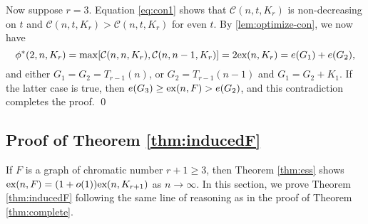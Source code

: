 \documentclass[12pt]{article}
\newcommand*{\ex}{\textnormal{ex}}
\newcommand*{\con}{\mathcal{C}}
\begin{document}
Now suppose $r = 3$. Equation \eqref{eq:con1} shows that $\con(n, t, K_r)$ is non-decreasing on $t$ and $\con(n, t, K_r) > \con(n, t, K_r)$ for even $t$. By \cref{lem:optimize-con}, we now have 
\[
  \phi^*(2, n, K_r) = \max[\con(n, n, K_r), \con(n, n - 1, K_r)] = 2\ex(n, K_r) = e(G_1) + e(G_2),
\]
and either $G_1 = G_2 = T_{r - 1}(n)$, or $G_2 = T_{r - 1}(n - 1)$ and $G_1 = G_2 + K_1$. If the latter case is true, then $e(G_3) \geq \ex(n, F) > e(G_2)$, and this contradiction completes the proof. \qed

\subsection{Proof of Theorem \ref{thm:inducedF}}

If $F$ is a graph of chromatic number $r + 1 \geq 3$, then Theorem \ref{thm:ess} shows 
$\ex(n,F)= (1 + o(1))\ex(n,K_{r+1})$ as $n \rightarrow \infty$. In this section, we prove Theorem \ref{thm:inducedF} following the same line of reasoning as in the proof of Theorem \ref{thm:complete}.
\end{document}
